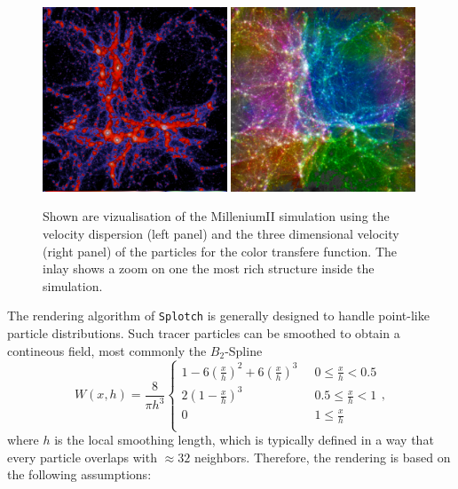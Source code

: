 \begin{figure}
\begin{center}
\includegraphics[width=0.49\textwidth]{millenium2_veldisp.pdf}
\includegraphics[width=0.49\textwidth]{millenium2_vel.pdf}
\end{center}
\caption{Shown are vizualisation of the MilleniumII simulation \citep{2009MNRAS.398.1150B} using
the velocity dispersion (left panel) and the three dimensional velocity (right panel) of the
particles for the color transfere function. The inlay shows a zoom on one the most rich structure
inside the simulation.}\label{mil2}
\end{figure}

The rendering algorithm of {\tt Splotch} is generally designed to handle
point-like particle distributions. Such tracer particles can be smoothed
to obtain a contineous field, most commonly the $B_2$-Spline \citep{1985A&A...149..135M}
\begin{equation}
   W(x,h)=\frac{8}{\pi h^3}\left\{\begin{array}{ll}
      1 - 6 \left(\frac{x}{h}\right)^2 + 6 \left(\frac{x}{h}\right)^3 \;\;& 0 \le \frac{x}{h} < 0.5 \\
      2 \left(1 - \frac{x}{h}\right)^3                              & 0.5 \le \frac{x}{h} < 1 \\
      0                                                             & 1 \le \frac{x}{h} \\
   \end{array} \right. , \label{SPH:kern}
\end{equation}
where $h$ is the local smoothing length, which is typically defined in a way
that every particle overlaps with $\approx 32$ neighbors. Therefore, the rendering is
based on the following assumptions:

